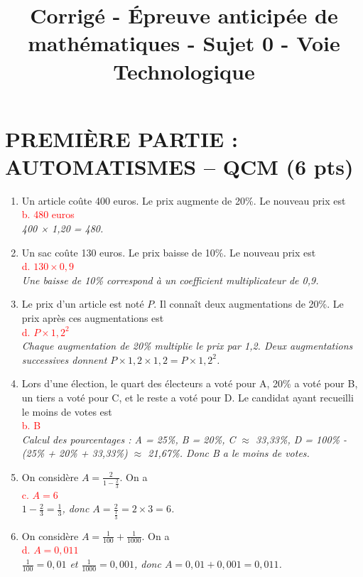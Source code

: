 \documentclass[11pt,a4paper]{article}
\title{Corrigé - Épreuve anticipée de mathématiques - Sujet 0 - Voie Technologique}
\author{}
\date{}
\newcommand{\reponse}[1]{\textcolor{red}{#1}}
\begin{document}
\maketitle

\section*{PREMIÈRE PARTIE : AUTOMATISMES – QCM (6 pts)}

\begin{enumerate}
    \item Un article coûte 400 euros. Le prix augmente de 20\%. Le nouveau prix est \\
    \reponse{b. 480 euros} \\
    \textit{400 × 1,20 = 480.}

    \item Un sac coûte 130 euros. Le prix baisse de 10\%. Le nouveau prix est \\
    \reponse{d. $130 \times 0,9$} \\
    \textit{Une baisse de 10\% correspond à un coefficient multiplicateur de 0,9.}

    \item Le prix d'un article est noté $P$. Il connaît deux augmentations de 20\%. Le prix après ces augmentations est \\
    \reponse{d. $P \times 1,2^2$} \\
    \textit{Chaque augmentation de 20\% multiplie le prix par 1,2. Deux augmentations successives donnent $P \times 1,2 \times 1,2 = P \times 1,2^2$.}

    \item Lors d'une élection, le quart des électeurs a voté pour A, 20\% a voté pour B, un tiers a voté pour C, et le reste a voté pour D. Le candidat ayant recueilli le moins de votes est \\
    \reponse{b. B} \\
    \textit{Calcul des pourcentages : A = 25\%, B = 20\%, C $\approx$ 33,33\%, D = 100\% - (25\% + 20\% + 33,33\%) $\approx$ 21,67\%. Donc B a le moins de votes.}

    \item On considère $A = \frac{2}{1 - \frac{2}{3}}$. On a \\
    \reponse{c. $A = 6$} \\
    \textit{$1 - \frac{2}{3} = \frac{1}{3}$, donc $A = \frac{2}{\frac{1}{3}} = 2 \times 3 = 6$.}

    \item On considère $A = \frac{1}{100} + \frac{1}{1000}$. On a \\
    \reponse{d. $A = 0,011$} \\
    \textit{$\frac{1}{100} = 0,01$ et $\frac{1}{1000} = 0,001$, donc $A = 0,01 + 0,001 = 0,011$.}


\end{enumerate}
\end{document}
